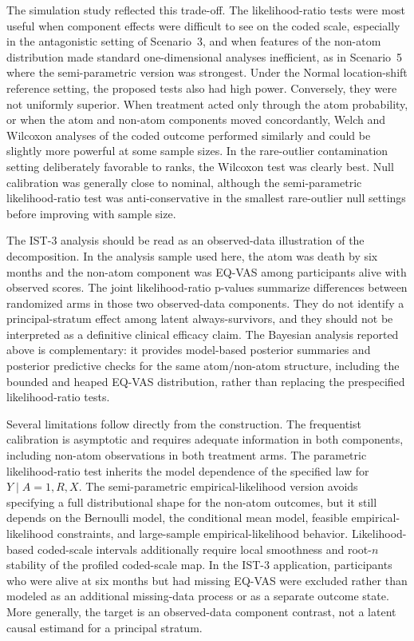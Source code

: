 \documentclass[11pt]{article}
\begin{document}
The simulation study reflected this trade-off. The likelihood-ratio tests were most useful when component effects were difficult to see on the coded scale, especially in the antagonistic setting of Scenario~3, and when features of the non-atom distribution made standard one-dimensional analyses inefficient, as in Scenario~5 where the semi-parametric version was strongest. Under the Normal location-shift reference setting, the proposed tests also had high power. Conversely, they were not uniformly superior. When treatment acted only through the atom probability, or when the atom and non-atom components moved concordantly, Welch and Wilcoxon analyses of the coded outcome performed similarly and could be slightly more powerful at some sample sizes. In the rare-outlier contamination setting deliberately favorable to ranks, the Wilcoxon test was clearly best. Null calibration was generally close to nominal, although the semi-parametric likelihood-ratio test was anti-conservative in the smallest rare-outlier null settings before improving with sample size.

The IST-3 analysis should be read as an observed-data illustration of the decomposition. In the analysis sample used here, the atom was death by six months and the non-atom component was EQ-VAS among participants alive with observed scores. The joint likelihood-ratio p-values summarize differences between randomized arms in those two observed-data components. They do not identify a principal-stratum effect among latent always-survivors, and they should not be interpreted as a definitive clinical efficacy claim. The Bayesian analysis reported above is complementary: it provides model-based posterior summaries and posterior predictive checks for the same atom/non-atom structure, including the bounded and heaped EQ-VAS distribution, rather than replacing the prespecified likelihood-ratio tests.

Several limitations follow directly from the construction. The frequentist calibration is asymptotic and requires adequate information in both components, including non-atom observations in both treatment arms. The parametric likelihood-ratio test inherits the model dependence of the specified law for $Y\mid A=1,R,X$. The semi-parametric empirical-likelihood version avoids specifying a full distributional shape for the non-atom outcomes, but it still depends on the Bernoulli model, the conditional mean model, feasible empirical-likelihood constraints, and large-sample empirical-likelihood behavior. Likelihood-based coded-scale intervals additionally require local smoothness and root-$n$ stability of the profiled coded-scale map. In the IST-3 application, participants who were alive at six months but had missing EQ-VAS were excluded rather than modeled as an additional missing-data process or as a separate outcome state. More generally, the target is an observed-data component contrast, not a latent causal estimand for a principal stratum.
\end{document}
